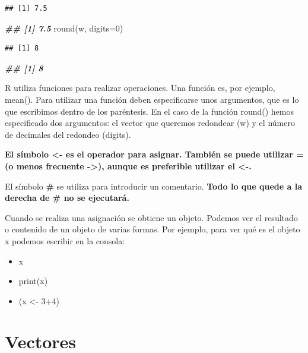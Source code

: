 \documentclass[
]{book}
\newenvironment{Shaded}{\begin{snugshade}}{\end{snugshade}}
\newcommand{\AttributeTok}[1]{\textcolor[rgb]{0.77,0.63,0.00}{#1}}
\newcommand{\DecValTok}[1]{\textcolor[rgb]{0.00,0.00,0.81}{#1}}
\newcommand{\DocumentationTok}[1]{\textcolor[rgb]{0.56,0.35,0.01}{\textbf{\textit{#1}}}}
\newcommand{\FunctionTok}[1]{\textcolor[rgb]{0.00,0.00,0.00}{#1}}
\newcommand{\NormalTok}[1]{#1}
\begin{document}
\begin{verbatim}
## [1] 7.5
\end{verbatim}

\begin{Shaded}
\begin{Highlighting}[]
\DocumentationTok{\#\# [1] 7.5}
\FunctionTok{round}\NormalTok{(w, }\AttributeTok{digits=}\DecValTok{0}\NormalTok{)}
\end{Highlighting}
\end{Shaded}

\begin{verbatim}
## [1] 8
\end{verbatim}

\begin{Shaded}
\begin{Highlighting}[]
\DocumentationTok{\#\# [1] 8}
\end{Highlighting}
\end{Shaded}

R utiliza funciones para realizar operaciones. Una función es, por ejemplo, mean(). Para utilizar una función deben especificarse unos argumentos, que es lo que escribimos dentro de los paréntesis. En el caso de la función round() hemos especificado dos argumentos: el vector que queremos redondear (w) y el número de decimales del redondeo (digits).

\textbf{El símbolo \textless- es el operador para asignar. También se puede utilizar = (o menos frecuente -\textgreater), aunque es preferible utilizar el \textless-.}

El símbolo \textbf{\#} se utiliza para introducir un comentario. \textbf{Todo lo que quede a la derecha de \# no se ejecutará.}

Cuando se realiza una asignación se obtiene un objeto. Podemos ver el resultado o contenido de un objeto de varias formas. Por ejemplo, para ver qué es el objeto x podemos escribir en la consola:

\begin{itemize}
\item
  x
\item
  print(x)
\item
  (x \textless- 3+4)
\end{itemize}

\hypertarget{vectores}{%
\section{Vectores}\label{vectores}}
\end{document}
